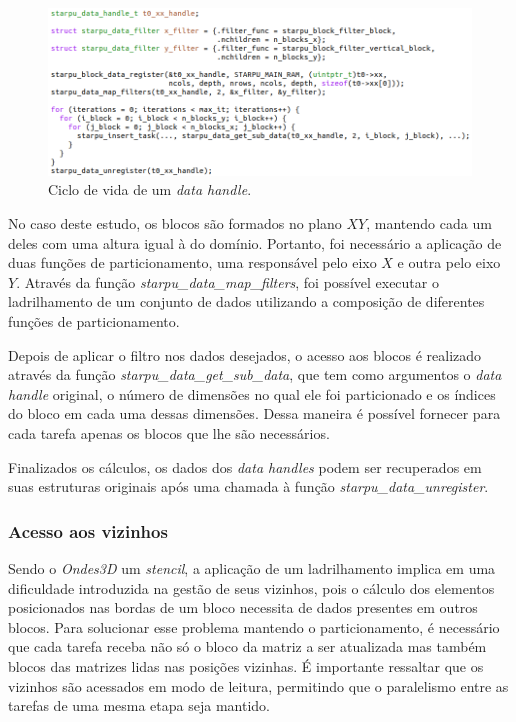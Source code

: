 \documentclass[cic,tc]{iiufrgs}
\begin{document}
\begin{figure}[!htb]
  \caption{Ciclo de vida de um \textit{data handle}.}
    \begin{center} 
      \includegraphics[width=35em]{data_cycle}
    \end{center}
    \label{fig:data_cycle}
\end{figure}

No caso deste estudo, os blocos são formados no plano $XY$, mantendo cada um deles com uma altura igual à do domínio. Portanto, foi
necessário a aplicação de duas funções de particionamento, uma responsável pelo eixo $X$ e outra pelo eixo $Y$. Através da função
\textit{starpu\_data\_map\_filters}, foi possível executar o ladrilhamento de um conjunto de dados utilizando a composição de
diferentes funções de particionamento.

Depois de aplicar o filtro nos dados desejados, o acesso aos blocos é realizado através da função \textit{starpu\_data\_get\_sub\_data},
que tem como argumentos o \textit{data handle} original, o número de dimensões no qual ele foi particionado e os índices do bloco em cada
uma dessas dimensões. Dessa maneira é possível fornecer para cada tarefa apenas os blocos que lhe são necessários.

Finalizados os cálculos, os dados dos \textit{data handles} podem ser recuperados em suas estruturas originais após
uma chamada à função \textit{starpu\_data\_unregister}.

\subsubsection*{Acesso aos vizinhos}\label{sec:neighborhood}

Sendo o \textit{Ondes3D} um \textit{stencil}, a aplicação de um ladrilhamento implica em uma dificuldade introduzida na gestão de seus
vizinhos, pois o cálculo dos elementos posicionados nas bordas de um bloco necessita de dados presentes em outros blocos. Para solucionar
esse problema mantendo o particionamento, é necessário que cada tarefa receba não só o bloco da matriz a ser atualizada mas também blocos
das matrizes lidas nas posições vizinhas. É importante ressaltar que os vizinhos são acessados em modo de leitura, permitindo
que o paralelismo entre as tarefas de uma mesma etapa seja mantido.
\end{document}
